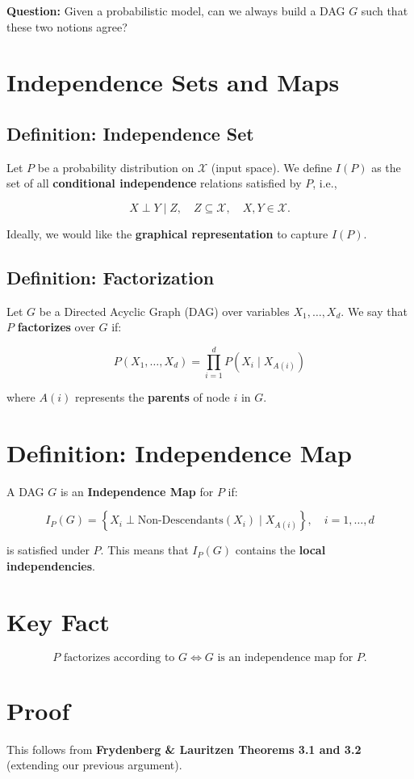\documentclass{article}%
\begin{document}
\textbf{Question:} Given a probabilistic model, can we always build a DAG \( G \) such that these two notions agree?

\section*{Independence Sets and Maps}

\subsection*{Definition: Independence Set}
Let \( P \) be a probability distribution on \( \mathcal{X} \) (input space). We define \( I(P) \) as the set of all \textbf{conditional independence} relations satisfied by \( P \), i.e.,

\[
X \perp Y \mid Z, \quad Z \subseteq \mathcal{X}, \quad X, Y \in \mathcal{X}.
\]

Ideally, we would like the \textbf{graphical representation} to capture \( I(P) \).

\subsection*{Definition: Factorization}
Let \( G \) be a Directed Acyclic Graph (DAG) over variables \( X_1, \dots, X_d \). We say that \( P \) \textbf{factorizes} over \( G \) if:

\[
P(X_1, \dots, X_d) = \prod_{i=1}^{d} P(X_i \mid X_{A(i)})
\]

where \( A(i) \) represents the \textbf{parents} of node \( i \) in \( G \).


\section*{Definition: Independence Map}
A DAG \( G \) is an \textbf{Independence Map} for \( P \) if:

\[
I_P(G) = \left\{ X_i \perp \text{Non-Descendants}(X_i) \mid X_{A(i)} \right\}, \quad i = 1, \dots, d
\]

is satisfied under \( P \). This means that \( I_P(G) \) contains the \textbf{local independencies}.

\section*{Key Fact}
\[
P \text{ factorizes according to } G \iff G \text{ is an independence map for } P.
\]

\section*{Proof}
This follows from \textbf{Frydenberg \& Lauritzen Theorems 3.1 and 3.2} (extending our previous argument).
\end{document}
